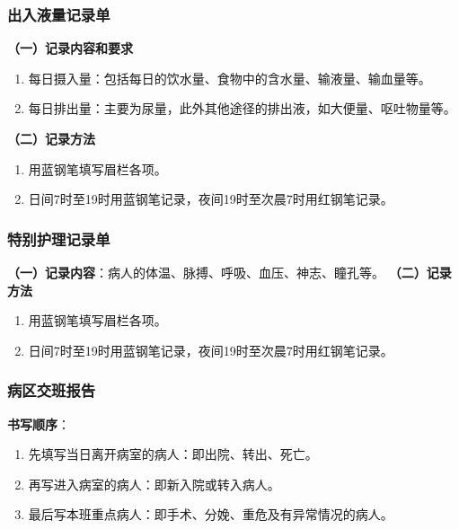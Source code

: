 \documentclass[11pt, a4paper]{ctexart}
\begin{document}
\subsubsection{出入液量记录单}
\textbf{（一）记录内容和要求}
\begin{enumerate}
    \item 每日摄入量：包括每日的饮水量、食物中的含水量、输液量、输血量等。
    \item 每日排出量：主要为尿量，此外其他途径的排出液，如大便量、呕吐物量等。
\end{enumerate}
\textbf{（二）记录方法}
\begin{enumerate}
    \item 用蓝钢笔填写眉栏各项。
    \item 日间7时至19时用蓝钢笔记录，夜间19时至次晨7时用红钢笔记录。
\end{enumerate}

\subsubsection{特别护理记录单}
\textbf{（一）记录内容}：病人的体温、脉搏、呼吸、血压、神志、瞳孔等。
\textbf{（二）记录方法}
\begin{enumerate}
    \item 用蓝钢笔填写眉栏各项。
    \item 日间7时至19时用蓝钢笔记录，夜间19时至次晨7时用红钢笔记录。
\end{enumerate}

\subsubsection{病区交班报告}
\textbf{书写顺序}：
\begin{enumerate}
    \item 先填写当日离开病室的病人：即出院、转出、死亡。
    \item 再写进入病室的病人：即新入院或转入病人。
    \item 最后写本班重点病人：即手术、分娩、重危及有异常情况的病人。
\end{enumerate}
\end{document}
